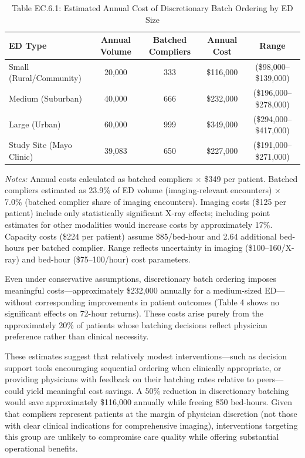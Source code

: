 \documentclass[11pt]{article}
\newcommand{\1}{\hbox{\rm 1\kern-.35em 1}}
\begin{document}
\begin{table}[t!]
\centering
\caption*{Table EC.6.1: Estimated Annual Cost of Discretionary Batch Ordering by ED Size}
\label{tab:costbenefit}
\begin{threeparttable}
\begin{tabular}{lcccc}
\toprule
ED Type & Annual Volume & Batched Compliers & Annual Cost & Range \\
\midrule
Small (Rural/Community) & 20,000 & 333 & \$116,000 & (\$98,000--\$139,000) \\
Medium (Suburban) & 40,000 & 666 & \$232,000 & (\$196,000--\$278,000) \\
Large (Urban) & 60,000 & 999 & \$349,000 & (\$294,000--\$417,000) \\
Study Site (Mayo Clinic) & 39,083 & 650 & \$227,000 & (\$191,000--\$271,000) \\
\bottomrule
\end{tabular}
\begin{tablenotes}
\footnotesize
\item \textit{Notes:} Annual costs calculated as batched compliers $\times$ \$349 per patient. Batched compliers estimated as 23.9\% of ED volume (imaging-relevant encounters) $\times$ 7.0\% (batched complier share of imaging encounters). Imaging costs (\$125 per patient) include only statistically significant X-ray effects; including point estimates for other modalities would increase costs by approximately 17\%. Capacity costs (\$224 per patient) assume \$85/bed-hour and 2.64 additional bed-hours per batched complier. Range reflects uncertainty in imaging (\$100--160/X-ray) and bed-hour (\$75--100/hour) cost parameters.
\end{tablenotes}
\end{threeparttable}
\end{table}

Even under conservative assumptions, discretionary batch ordering imposes meaningful costs---approximately \$232,000 annually for a medium-sized ED---without corresponding improvements in patient outcomes (Table 4 shows no significant effects on 72-hour returns). These costs arise purely from the approximately 20\% of patients whose batching decisions reflect physician preference rather than clinical necessity.

These estimates suggest that relatively modest interventions---such as decision support tools encouraging sequential ordering when clinically appropriate, or providing physicians with feedback on their batching rates relative to peers---could yield meaningful cost savings. A 50\% reduction in discretionary batching would save approximately \$116,000 annually while freeing 850 bed-hours. Given that compliers represent patients at the margin of physician discretion (not those with clear clinical indications for comprehensive imaging), interventions targeting this group are unlikely to compromise care quality while offering substantial operational benefits.
\end{document}
